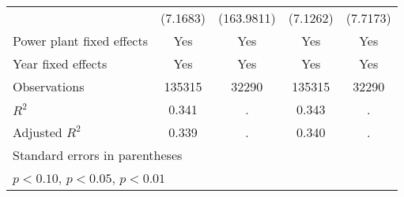 {\begin{tabular}{l*{4}{c}}
                    &    (7.1683)         &  (163.9811)         &    (7.1262)         &    (7.7173)         \\
\addlinespace
Power plant fixed effects&         Yes         &         Yes         &         Yes         &         Yes         \\
\addlinespace
Year fixed effects  &         Yes         &         Yes         &         Yes         &         Yes         \\
\midrule
Observations        &      135315         &       32290         &      135315         &       32290         \\
\(R^{2}\)           &       0.341         &           .         &       0.343         &           .         \\
Adjusted \(R^{2}\)  &       0.339         &           .         &       0.340         &           .         \\
\bottomrule
\multicolumn{5}{l}{\footnotesize Standard errors in parentheses}\\
\multicolumn{5}{l}{\footnotesize \sym{*} \(p<0.10\), \sym{**} \(p<0.05\), \sym{***} \(p<0.01\)}\\
\end{tabular}
}
